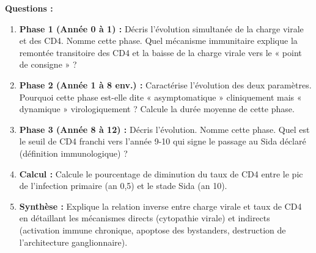 \documentclass[11pt]{article}
\begin{document}
\begin{exercice}
\textbf{Questions :}
\begin{enumerate}
    \item \textbf{Phase 1 (Année 0 à 1) :} Décris l'évolution simultanée de la charge virale et des CD4. Nomme cette phase. Quel mécanisme immunitaire explique la remontée transitoire des CD4 et la baisse de la charge virale vers le « point de consigne » ?
    \item \textbf{Phase 2 (Année 1 à 8 env.) :} Caractérise l'évolution des deux paramètres. Pourquoi cette phase est-elle dite « asymptomatique » cliniquement mais « dynamique » virologiquement ? Calcule la durée moyenne de cette phase.
    \item \textbf{Phase 3 (Année 8 à 12) :} Décris l'évolution. Nomme cette phase. Quel est le seuil de CD4 franchi vers l'année 9-10 qui signe le passage au Sida déclaré (définition immunologique) ?
    \item \textbf{Calcul :} Calcule le pourcentage de diminution du taux de CD4 entre le pic de l'infection primaire (an 0,5) et le stade Sida (an 10).
    \item \textbf{Synthèse :} Explique la relation inverse entre charge virale et taux de CD4 en détaillant les mécanismes directs (cytopathie virale) et indirects (activation immune chronique, apoptose des bystanders, destruction de l'architecture ganglionnaire).
\end{enumerate}
\end{exercice}
\end{document}
